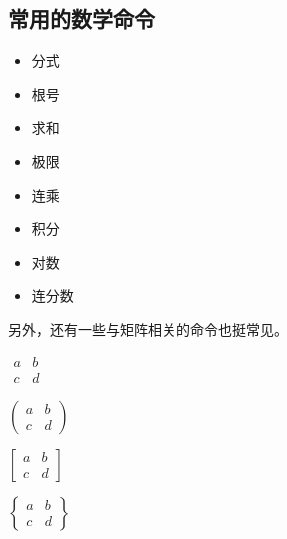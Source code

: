 {{{\subsection{常用的数学命令}
\begin{itemize}
	\item 分式 
	\item 根号 
	\item 求和 
	\item 极限 
	\item 连乘 
	\item 积分 
	\item 对数 
	\item 连分数 
\end{itemize}

另外，还有一些与矩阵相关的命令也挺常见。
\begin{texlst}
\begin{math}
\begin{matrix}
	a & b \\
	c & d
\end{matrix}
\end{math}
\end{texlst}

\begin{texlst}
\begin{math}
\begin{pmatrix}
	a & b \\
	c & d
\end{pmatrix}
\end{math}
\end{texlst}

\begin{texlst}
\begin{math}
\begin{bmatrix}
	a & b \\
	c & d
\end{bmatrix}
\end{math}
\end{texlst}

\begin{texlst}
\begin{math}
\begin{Bmatrix}
	a & b \\
	c & d
\end{Bmatrix}
\end{math}
\end{texlst}

}}}
